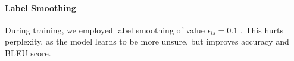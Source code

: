 
\paragraph{Label Smoothing} During training, we employed label smoothing of
value $\epsilon_{ls}=0.1$ \citep{DBLP:journals/corr/SzegedyVISW15}.  This hurts
perplexity, as the model learns to be more unsure, but improves accuracy and
BLEU score.
